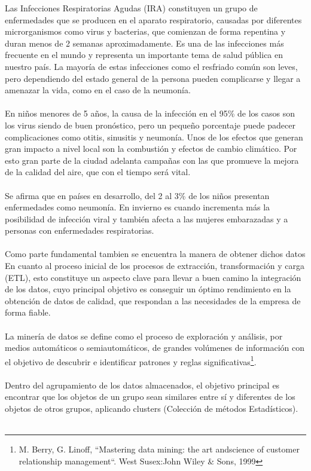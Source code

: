 \documentclass[a4paper,openright,12pt]{book}
\theoremstyle{definition}
\theoremstyle{remark}
\begin{document}
Las Infecciones Respiratorias Agudas (IRA) constituyen un grupo de enfermedades que se producen en el aparato respiratorio, causadas por diferentes microrganismos como virus y bacterias, que comienzan de forma repentina y duran menos de 2 semanas aproximadamente. Es una de las infecciones más frecuente en el mundo y representa un importante tema de salud pública en nuestro país.  La mayoría de estas infecciones como el resfriado común son leves, pero dependiendo del estado general de la persona pueden complicarse y llegar a amenazar la vida, como en el caso de la neumonía.\\\\
En niños menores de 5 años, la causa de la infección en el  95\% de los casos son los virus siendo de buen pronóstico, pero un pequeño porcentaje puede padecer complicaciones como  otitis, sinusitis y neumonía. Unos de los efectos que generan gran impacto a nivel local son  la combustión y efectos de cambio climático. Por esto  gran parte de la ciudad adelanta campañas con las que promueve la mejora de la calidad del aire, que con el tiempo será vital.\\\\
Se afirma que en países en desarrollo, del 2 al 3\% de los niños presentan enfermedades como neumonía. En invierno es cuando incrementa más la posibilidad de infección viral y también afecta a las mujeres embarazadas y a personas con enfermedades respiratorias.\\\\
Como parte fundamental tambien se encuentra la manera de obtener dichos datos En cuanto al proceso inicial de los procesos de extracción, transformación y carga (ETL), esto constituye un aspecto clave para llevar a buen camino la integración de los datos, cuyo principal objetivo es conseguir un óptimo rendimiento en la obtención de datos de calidad, que respondan a las necesidades de la empresa de forma fiable.\\\\
La minería de datos se define como el proceso de
exploración y análisis, por medios automáticos o
semiautomáticos, de grandes volúmenes de información
con el objetivo de descubrir e identificar patrones y reglas
significativas\footnote{M. Berry, G. Linoff, “Mastering data mining: the art andscience of customer relationship management“. West Susex:John Wiley \& Sons, 1999}.\\\\
Dentro del agrupamiento de los datos almacenados, el objetivo principal es encontrar que los objetos de un grupo sean similares entre sí y diferentes de los objetos de otros grupos, aplicando clusters (Colección de métodos Estadísticos).\\\\
\end{document}
